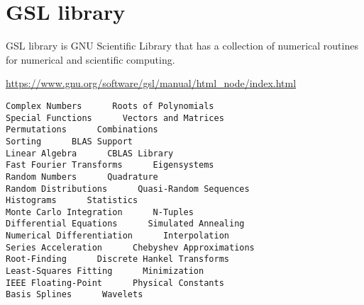 \chapter{GSL library}
\label{chap:GSL-lib}

GSL library is GNU Scientific Library that has 
a collection of numerical routines for numerical and scientific computing.

\url{https://www.gnu.org/software/gsl/manual/html_node/index.html}

\begin{verbatim}
Complex Numbers      Roots of Polynomials
Special Functions      Vectors and Matrices
Permutations      Combinations
Sorting      BLAS Support
Linear Algebra      CBLAS Library
Fast Fourier Transforms      Eigensystems
Random Numbers      Quadrature
Random Distributions      Quasi-Random Sequences
Histograms      Statistics
Monte Carlo Integration      N-Tuples
Differential Equations      Simulated Annealing
Numerical Differentiation      Interpolation
Series Acceleration      Chebyshev Approximations
Root-Finding      Discrete Hankel Transforms
Least-Squares Fitting      Minimization
IEEE Floating-Point      Physical Constants
Basis Splines      Wavelets
\end{verbatim}